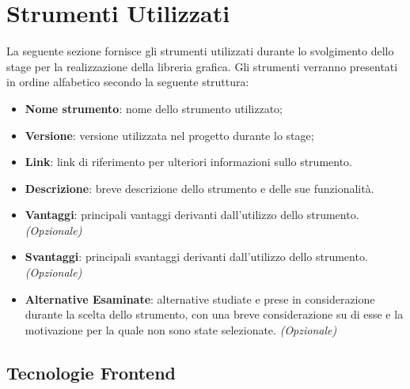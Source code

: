 \section{Strumenti Utilizzati}
La seguente sezione fornisce gli strumenti utilizzati durante lo svolgimento dello stage per la realizzazione della libreria grafica.
Gli strumenti verranno presentati in ordine alfabetico secondo la seguente struttura:
\begin{itemize}
      \item \textbf{Nome strumento}: nome dello strumento utilizzato;
      \item \textbf{Versione}: versione utilizzata nel progetto durante lo stage;
      \item \textbf{Link}: link di riferimento per ulteriori informazioni sullo strumento.
      \item \textbf{Descrizione}: breve descrizione dello strumento e delle sue funzionalità.
      \item \textbf{Vantaggi}: principali vantaggi derivanti dall'utilizzo dello strumento. \textit{(Opzionale)}
      \item \textbf{Svantaggi}: principali svantaggi derivanti dall'utilizzo dello strumento. \textit{(Opzionale)}
      \item \textbf{Alternative Esaminate}: alternative studiate e prese in considerazione durante la scelta dello strumento, con una breve considerazione
            su di esse e la motivazione per la quale non sono state selezionate. \textit{(Opzionale)}
\end{itemize}

\subsection{Tecnologie Frontend}

